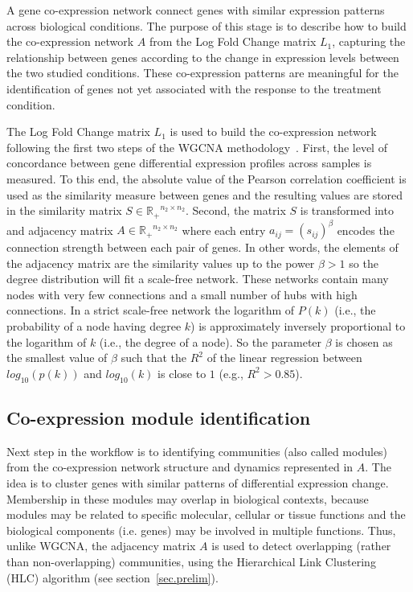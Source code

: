 A gene co-expression network connect genes with similar expression patterns across biological conditions. The purpose of this stage is to describe how to build the co-expression network $A$ from the Log Fold Change matrix $L_1$, capturing the relationship between genes according to the change in expression levels between the two studied conditions. These co-expression patterns are meaningful for the identification of genes not yet associated with the response to the treatment condition.

The Log Fold Change matrix $L_1$ is used to build the co-expression network following the first two steps of the WGCNA methodology~\cite{langfelder2008wgcna}. First, the level of concordance between gene differential expression profiles across samples is measured. To this end, the absolute value of the Pearson correlation coefficient is used as the similarity measure between genes and the resulting values are stored in the similarity matrix $S\in \mathbb{R_{+}}^{n_2 \times n_2}$. Second, the matrix $S$ is transformed into and adjacency matrix $A \in \mathbb{R_+}^{n_2\times n_2}$ where each entry $a_{ij} = (s_{ij})^\beta $ encodes the connection strength between each pair of genes. In other words, the elements of the adjacency matrix are the similarity values up to the power $\beta > 1$ so the degree distribution will fit a scale-free network. These networks contain many nodes with very few connections and a small number of hubs with high connections. In a strict scale-free network the logarithm of $P(k)$ (i.e., the probability of a node having degree $k$) is approximately inversely proportional to the logarithm of $k$ (i.e., the degree of a node). So the parameter $\beta$ is chosen as the smallest value of $\beta$ such that the $R^2$ of the linear regression between $log_{10}(p(k))$ and $log_{10}(k)$ is close to $1$ (e.g., $R^2 > 0.85$). 

\subsection{Co-expression module identification}

Next step in the workflow is to identifying communities (also called modules)
from the co-expression network structure and dynamics represented in $A$. 
The idea is to cluster genes with similar patterns of differential
expression change. Membership in these modules may overlap in 
biological contexts, because modules may be related to specific 
molecular, cellular or tissue functions and the biological components
(i.e. genes) may be involved in multiple functions. Thus, unlike WGCNA, the adjacency matrix $A$ is used to detect overlapping (rather than non-overlapping) communities, using the Hierarchical Link Clustering (HLC) algorithm (see section~\ref{sec.prelim}).

